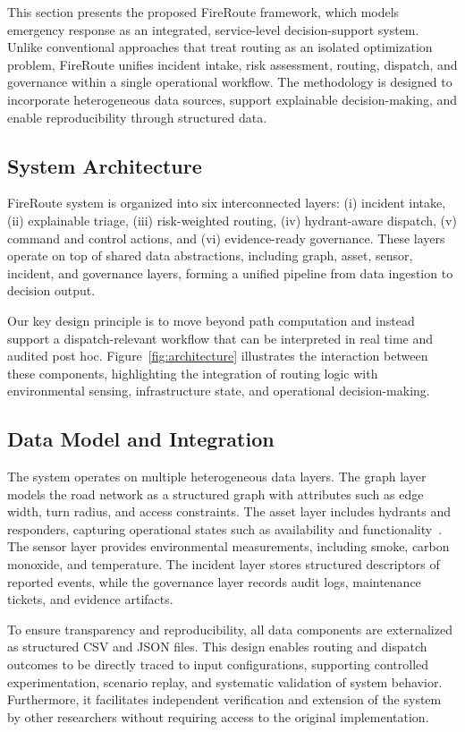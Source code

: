 This section presents the proposed FireRoute framework, which models emergency response as an integrated, service-level decision-support system. Unlike conventional approaches that treat routing as an isolated optimization problem, FireRoute unifies incident intake, risk assessment, routing, dispatch, and governance within a single operational workflow. The methodology is designed to incorporate heterogeneous data sources, support explainable decision-making, and enable reproducibility through structured data.


\subsection{System Architecture}

FireRoute system is organized into six interconnected layers: (i) incident intake, (ii) explainable triage, (iii) risk-weighted routing, (iv) hydrant-aware dispatch, (v) command and control actions, and (vi) evidence-ready governance. These layers operate on top of shared data abstractions, including graph, asset, sensor, incident, and governance layers, forming a unified pipeline from data ingestion to decision output.


Our key design principle is to move beyond path computation and instead support a dispatch-relevant workflow that can be interpreted in real time and audited post hoc. Figure~\ref{fig:architecture} illustrates the interaction between these components, highlighting the integration of routing logic with environmental sensing, infrastructure state, and operational decision-making.

\subsection{Data Model and Integration}

The system operates on multiple heterogeneous data layers. The graph layer models the road network as a structured graph with attributes such as edge width, turn radius, and access constraints. The asset layer includes hydrants and responders, capturing operational states such as availability and functionality~\cite{P2026108912}. The sensor layer provides environmental measurements, including smoke, carbon monoxide, and temperature. The incident layer stores structured descriptors of reported events, while the governance layer records audit logs, maintenance tickets, and evidence artifacts.

To ensure transparency and reproducibility, all data components are externalized as structured CSV and JSON files. This design enables routing and dispatch outcomes to be directly traced to input configurations, supporting controlled experimentation, scenario replay, and systematic validation of system behavior. Furthermore, it facilitates independent verification and extension of the system by other researchers without requiring access to the original implementation.

